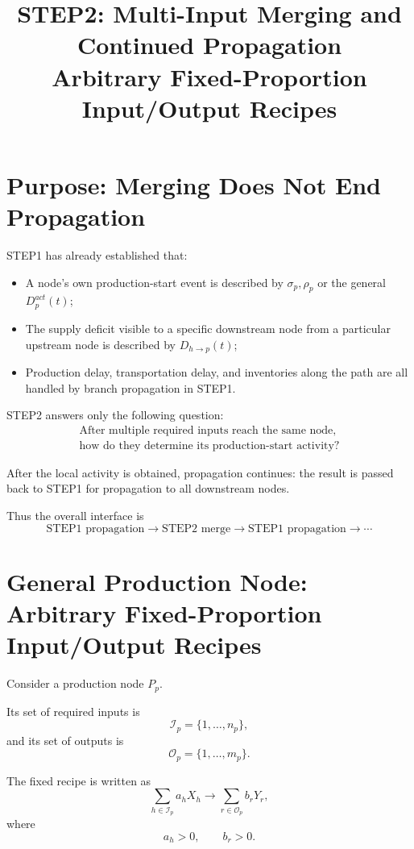 \documentclass[11pt]{article}
\title{STEP2: Multi-Input Merging and Continued Propagation\\
Arbitrary Fixed-Proportion Input/Output Recipes}
\author{}
\date{}
\begin{document}
\maketitle

\section{Purpose: Merging Does Not End Propagation}

STEP1 has already established that:

\begin{itemize}
    \item A node's own production-start event is described by
    \(\sigma_p,\rho_p\) or the general \(D_p^{act}(t)\);
    \item The supply deficit visible to a specific downstream node from a particular upstream node is described by
    \(D_{h\to p}(t)\);
    \item Production delay, transportation delay, and inventories along the path
    are all handled by branch propagation in STEP1.
\end{itemize}

STEP2 answers only the following question:
\[
\boxed{\begin{gathered}
\text{After multiple required inputs reach the same node,}\\
\text{how do they determine its production-start activity?}
\end{gathered}}
\]

After the local activity is obtained, propagation continues: the result is passed back to STEP1 for propagation to all downstream nodes.

Thus the overall interface is
\[
\boxed{
\text{STEP1 propagation}
\rightarrow
\text{STEP2 merge}
\rightarrow
\text{STEP1 propagation}
\rightarrow\cdots
}
\tag{1}
\]

\section{General Production Node: Arbitrary Fixed-Proportion Input/Output Recipes}

Consider a production node \(P_p\).

Its set of required inputs is
\[
\mathcal I_p=\{1,\ldots,n_p\},
\]
and its set of outputs is
\[
\mathcal O_p=\{1,\ldots,m_p\}.
\]

The fixed recipe is written as
\[
\boxed{
\sum_{h\in\mathcal I_p}a_hX_h
\longrightarrow
\sum_{r\in\mathcal O_p}b_rY_r,
}
\tag{2}
\]
where
\[
a_h>0,
\qquad
b_r>0.
\]
\end{document}
